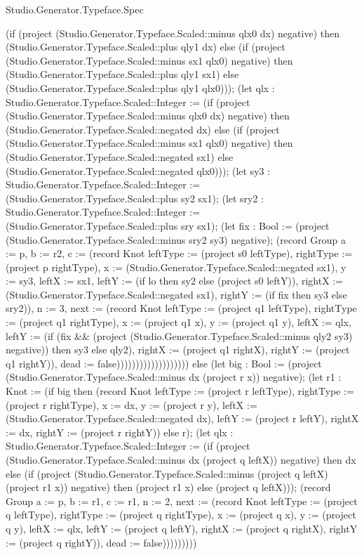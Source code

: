 \begin{lexlean}{Studio.Generator.Typeface.Spec}
\begin{semanticmodule}
{(if (project (Studio.Generator.Typeface.Scaled::minus qlx0 dx) negative) then (Studio.Generator.Typeface.Scaled::plus qly1 dx) else (if (project (Studio.Generator.Typeface.Scaled::minus sx1 qlx0) negative) then (Studio.Generator.Typeface.Scaled::plus qly1 sx1) else (Studio.Generator.Typeface.Scaled::plus qly1 qlx0))); (let qlx : Studio.Generator.Typeface.Scaled::Integer := (if (project (Studio.Generator.Typeface.Scaled::minus qlx0 dx) negative) then (Studio.Generator.Typeface.Scaled::negated dx) else (if (project (Studio.Generator.Typeface.Scaled::minus sx1 qlx0) negative) then (Studio.Generator.Typeface.Scaled::negated sx1) else (Studio.Generator.Typeface.Scaled::negated qlx0))); (let sy3 : Studio.Generator.Typeface.Scaled::Integer := (Studio.Generator.Typeface.Scaled::plus sy2 sx1); (let sry2 : Studio.Generator.Typeface.Scaled::Integer := (Studio.Generator.Typeface.Scaled::plus sry sx1); (let fix : Bool := (project (Studio.Generator.Typeface.Scaled::minus sry2 sy3) negative); (record Group {a := p, b := r2, c := (record Knot {leftType := (project s0 leftType), rightType := (project p rightType), x := (Studio.Generator.Typeface.Scaled::negated sx1), y := sy3, leftX := sx1, leftY := (if lo then sy2 else (project s0 leftY)), rightX := (Studio.Generator.Typeface.Scaled::negated sx1), rightY := (if fix then sy3 else sry2)}), n := 3, next := (record Knot {leftType := (project q1 leftType), rightType := (project q1 rightType), x := (project q1 x), y := (project q1 y), leftX := qlx, leftY := (if (fix && (project (Studio.Generator.Typeface.Scaled::minus qly2 sy3) negative)) then sy3 else qly2), rightX := (project q1 rightX), rightY := (project q1 rightY)}), dead := false}))))))))))))))))))) else (let big : Bool := (project (Studio.Generator.Typeface.Scaled::minus dx (project r x)) negative); (let r1 : Knot := (if big then (record Knot {leftType := (project r leftType), rightType := (project r rightType), x := dx, y := (project r y), leftX := (Studio.Generator.Typeface.Scaled::negated dx), leftY := (project r leftY), rightX := dx, rightY := (project r rightY)}) else r); (let qlx : Studio.Generator.Typeface.Scaled::Integer := (if (project (Studio.Generator.Typeface.Scaled::minus dx (project q leftX)) negative) then dx else (if (project (Studio.Generator.Typeface.Scaled::minus (project q leftX) (project r1 x)) negative) then (project r1 x) else (project q leftX))); (record Group {a := p, b := r1, c := r1, n := 2, next := (record Knot {leftType := (project q leftType), rightType := (project q rightType), x := (project q x), y := (project q y), leftX := qlx, leftY := (project q leftY), rightX := (project q rightX), rightY := (project q rightY)}), dead := false})))))))))
}


\end{semanticmodule}
\end{lexlean}
